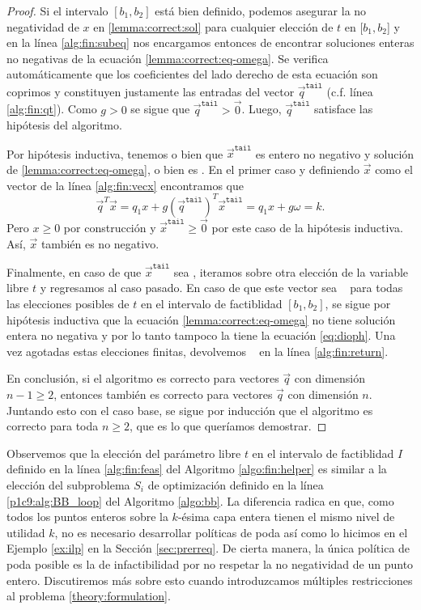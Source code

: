 \begin{proof}
	Si el intervalo $[b_1, b_2]$ está bien definido, podemos asegurar la no negatividad de $x$ en
	\eqref{lemma:correct:sol} para cualquier elección de $t$ en $[b_1, b_2$] y en
	la línea \eqref{alg:fin:subeq} nos encargamos entonces de encontrar soluciones enteras no negativas
	de la ecuación \eqref{lemma:correct:eq-omega}. Se verifica automáticamente que los coeficientes
	del lado derecho de esta ecuación son coprimos y constituyen justamente las entradas del vector
	$\vec{q}^{\texttt{tail}}$ (c.f. línea \eqref{alg:fin:qt}). Como $g > 0$ se sigue que
	$\vec{q}^{\texttt{tail}} > \vec{0}$. Luego, $\vec{q}^{\texttt{tail}}$ satisface las hipótesis
	del algoritmo.

	Por hipótesis inductiva, tenemos o bien que $\vec{x}^{\texttt{tail}}$ es entero no negativo y
	solución de \eqref{lemma:correct:eq-omega}, o bien es \NIL. En el primer caso y definiendo
	$\vec{x}$ como el vector de la línea \eqref{alg:fin:vecx} encontramos que
	\begin{equation*}
		\vec{q}^T\vec{x} = q_1x + g\left(\vec{q}^{\texttt{tail}}\right)^T\vec{x}^{\texttt{tail}}
		= q_1x + g\omega = k.
	\end{equation*}
	Pero $x \geq 0$ por construcción y $\vec{x}^{\texttt{tail}} \geq \vec{0}$ por este caso de la
	hipótesis inductiva. Así, $\vec{x}$ también es no negativo.

	Finalmente, en caso de que $\vec{x}^{\texttt{tail}}$ sea \NIL, iteramos sobre otra elección de
	la variable libre $t$ y regresamos al caso pasado. En caso de que este vector sea \NIL~ para
	todas las elecciones posibles de $t$ en el intervalo de factiblidad $[b_1, b_2]$, se sigue por
	hipótesis inductiva que la ecuación \eqref{lemma:correct:eq-omega} no tiene solución entera no
	negativa y por lo tanto tampoco la tiene la ecuación \eqref{eq:dioph}. Una vez agotadas estas
	elecciones finitas, devolvemos \NIL~ en la línea \eqref{alg:fin:return}.

	En conclusión, si el algoritmo es correcto para vectores $\vec{q}$ con dimensión $n - 1 \geq 2$,
	entonces también es correcto para vectores $\vec{q}$ con dimensión $n$. Juntando esto con el
	caso base, se sigue por inducción que el algoritmo es correcto para toda $n \geq 2$, que es lo
	que queríamos demostrar.
\end{proof}

Observemos que la elección del parámetro libre $t$ en el intervalo de factiblidad $I$ definido en la
línea \eqref{alg:fin:feas} del Algoritmo \ref{algo:fin:helper} es similar a la elección del
subproblema $S_i$ de optimización definido en la línea \eqref{p1c9:alg:BB_loop} del Algoritmo
\ref{algo:bb}. La diferencia radica en que, como todos los puntos enteros sobre la $k$-ésima capa
entera tienen el mismo nivel de utilidad $k$, no es necesario desarrollar políticas de poda así como
lo hicimos en el Ejemplo \ref{ex:ilp} en la Sección \ref{sec:prerreq}. De cierta manera, la única
política de poda posible es la de infactibilidad por no respetar la no negatividad de un punto
entero. Discutiremos más sobre esto cuando introduzcamos múltiples restricciones al problema
\eqref{theory:formulation}.

